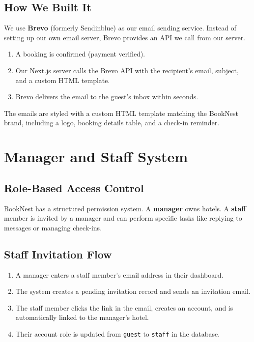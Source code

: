 \documentclass[12pt,a4paper]{article}
\begin{document}
\subsection{How We Built It}

We use \textbf{Brevo} (formerly Sendinblue) as our email sending service. Instead of setting up our own email server, Brevo provides an API we call from our server.

\begin{enumerate}
  \item A booking is confirmed (payment verified).
  \item Our Next.js server calls the Brevo API with the recipient's email, subject, and a custom HTML template.
  \item Brevo delivers the email to the guest's inbox within seconds.
\end{enumerate}

The emails are styled with a custom HTML template matching the BookNest brand, including a logo, booking details table, and a check-in reminder.

\newpage
\section{Manager and Staff System}

\subsection{Role-Based Access Control}
BookNest has a structured permission system. A \textbf{manager} owns hotels. A \textbf{staff} member is invited by a manager and can perform specific tasks like replying to messages or managing check-ins.

\subsection{Staff Invitation Flow}
\begin{enumerate}
  \item A manager enters a staff member's email address in their dashboard.
  \item The system creates a pending invitation record and sends an invitation email.
  \item The staff member clicks the link in the email, creates an account, and is automatically linked to the manager's hotel.
  \item Their account role is updated from \texttt{guest} to \texttt{staff} in the database.
\end{enumerate}
\end{document}
